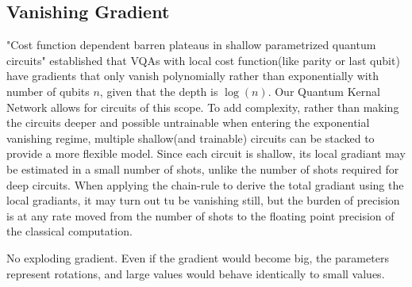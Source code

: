 \documentclass[]{article}
\begin{document}
\subsection{Vanishing Gradient}
"Cost function dependent barren plateaus in shallow parametrized quantum circuits" established that VQAs with local cost function(like parity or last qubit) have gradients that only vanish polynomially rather than exponentially with number of qubits $n$, given that the depth is $\log(n)$. Our Quantum Kernal Network allows for circuits of this scope. To add complexity, rather than making the circuits deeper and possible untrainable when entering the exponential vanishing regime, multiple shallow(and trainable) circuits can be stacked to provide a more flexible model. Since each circuit is shallow, its local gradiant may be estimated in a small number of shots, unlike the number of shots required for deep circuits. When applying the chain-rule to derive the total gradiant using the local gradiants, it may turn out tu be vanishing still, but the burden of precision is at any rate moved from the number of shots to the floating point precision of the classical computation.  

No exploding gradient. Even if the gradient would become big, the parameters represent rotations, and large values would behave identically to small values. 
\end{document}
